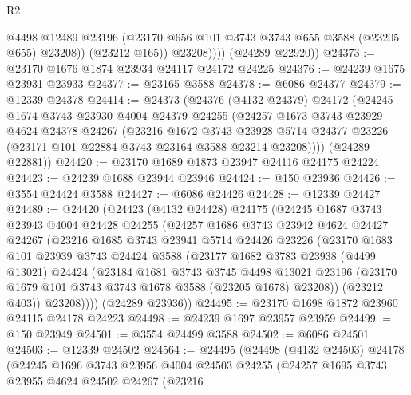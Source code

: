 \begin{lexlean}{R2}
\begin{coremodule}
                  @4498
                  @12489
                  @23196
                  (@23170 @656 @101 @3743 @3743 @655 @3588 (@23205 @655) @23208))
                (@23212 @165))
              @23208))))
      (@24289 @22920))
@24373 := @23170 @1676 @1874 @23934 @24117 @24172 @24225
@24376 := @24239 @1675 @23931 @23933
@24377 := @23165 @3588
@24378 := @6086 @24377
@24379 := @12339 @24378
@24414 := @24373
    (@24376
      (@4132 @24379)
      @24172
      (@24245
        @1674
        @3743
        @23930
        @4004
        @24379
        @24255
        (@24257
          @1673
          @3743
          @23929
          @4624
          @24378
          @24267
          (@23216
            @1672
            @3743
            @23928
            @5714
            @24377
            @23226
            (@23171 @101 @22884 @3743 @23164 @3588 @23214 @23208))))
      (@24289 @22881))
@24420 := @23170 @1689 @1873 @23947 @24116 @24175 @24224
@24423 := @24239 @1688 @23944 @23946
@24424 := @150 @23936
@24426 := @3554 @24424 @3588
@24427 := @6086 @24426
@24428 := @12339 @24427
@24489 := @24420
    (@24423
      (@4132 @24428)
      @24175
      (@24245
        @1687
        @3743
        @23943
        @4004
        @24428
        @24255
        (@24257
          @1686
          @3743
          @23942
          @4624
          @24427
          @24267
          (@23216
            @1685
            @3743
            @23941
            @5714
            @24426
            @23226
            (@23170
              @1683
              @101
              @23939
              @3743
              @24424
              @3588
              (@23177
                @1682
                @3783
                @23938
                (@4499 @13021)
                @24424
                (@23184
                  @1681
                  @3743
                  @3745
                  @4498
                  @13021
                  @23196
                  (@23170 @1679 @101 @3743 @3743 @1678 @3588 (@23205 @1678) @23208))
                (@23212 @403))
              @23208))))
      (@24289 @23936))
@24495 := @23170 @1698 @1872 @23960 @24115 @24178 @24223
@24498 := @24239 @1697 @23957 @23959
@24499 := @150 @23949
@24501 := @3554 @24499 @3588
@24502 := @6086 @24501
@24503 := @12339 @24502
@24564 := @24495
    (@24498
      (@4132 @24503)
      @24178
      (@24245
        @1696
        @3743
        @23956
        @4004
        @24503
        @24255
        (@24257
          @1695
          @3743
          @23955
          @4624
          @24502
          @24267
          (@23216

\end{coremodule}
\end{lexlean}
